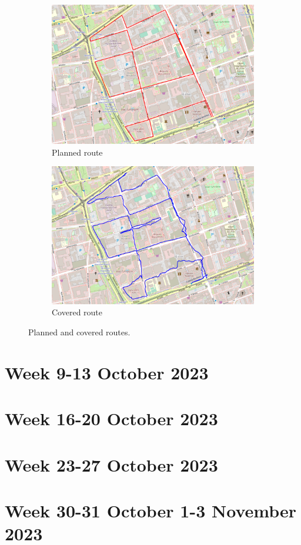 \documentclass[a4paper,12pt]{article}
\begin{document}
\begin{enumerate}
	\begin{figure}[H]
		\centering
		\begin{subfigure}{.77\textwidth}
			\centering
			\includegraphics[width=1\linewidth]{route_p15}
			\caption{Planned route}
			\label{fig:a15}
		\end{subfigure}%
		\linebreak
		\begin{subfigure}{.77\textwidth}
			\centering
			\includegraphics[width=1\linewidth]{route_c15}
			\caption{Covered route}
			\label{fig:b15}
		\end{subfigure}
		\caption{Planned and covered routes.}
		\label{fig:fig15}
	\end{figure} 
\end{enumerate}

\section{Week 9-13 October 2023}

\section{Week 16-20 October 2023}

\section{Week 23-27 October 2023}

\section{Week 30-31 October 1-3 November 2023}
\end{document}
